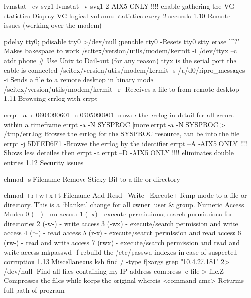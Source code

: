 lvmstat –ev svg1
lvmstat –v svg1 2    AIX5 ONLY !!!!
enable gathering the VG statistics
Display VG logical volumes statistics every 2 seconds
1.10    Remote issues (working over the modem)

pdelay tty0; pdisable tty0 >/dev/null ;penable tty0  
-Resets tty0
stty erase '^?'    Makes bakespace to work
/scitex/version/utils/modem/kermit -l /dev/ttyx –c atdt {phone #}     Use Unix to Dail-out  (for any reason) ttyx is the serial port the cable is connected
/scitex/version/utils/modem/kermit -s /u/d0/ripro_messages -i    Sends a file to a remote desktop in binary mode
/scitex/version/utils/modem/kermit –r
-Receives a file to from remote desktop
1.11    Browsing errlog with errpt

errpt -a  -s 0604090601  -e 0605090901    browse the errlog in  detail for all errors within a timeframe
errpt -a  -N SYSPROC |more
errpt -a  -N SYSPROC  > /tmp/err.log    Browse the errlog for the SYSPROC resource, can be into the file
errpt -j 5DFED6F1   -Browse the errlog by the identifier
errpt –A    -AIX5 ONLY !!!! Shows less detailes then errpt -a
errpt –D    -AIX5 ONLY !!!! eliminates double entries
1.12    Security issues

chmod -s Filename    Remove Sticky Bit to a file or directory

chmod +r+w+x+t Filename     Add Read+Write+Execute+Temp mode to a file or directory.
This is a ‘blanket’ change for all owner, user & group.
Numeric Access Modes  
0 (---) - no access
1 (--x) - execute permissions; search permissions for directories
2 (-w-) - write access
3 (-wx) - execute/search permission and write access
4 (r--) - read access
5 (r-x) - execute/search permission and read access
6 (rw-) - read and write access
7 (rwx) - execute/search permission and read and write access
mkpasswd -f    rebuild the /etc/passwd indexes in case of suspected corruption
1.13    Miscellaneous
ksh
find / -type f|xargs grep "10.4.27.181" 2> /dev/null
-Find all files containing my IP address
compress -c file > file.Z    Compresses the files while keeps the original
whereis  <command-ame>    Returms full path of program
